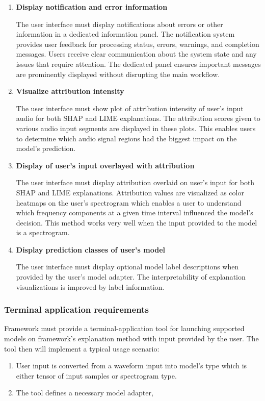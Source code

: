\documentclass[
    bindingoffset=5mm,  %
    footnoteindent=3mm, %
    hyphenation=true    %
]{src/wut-thesis}
\begin{document}
\begin{enumerate}
    \item \textbf{Display notification and error information}

        The user interface must display notifications about errors or other information in a dedicated information
    panel. The notification system provides user feedback for processing status, errors, warnings,
    and completion messages. Users receive clear communication about the system state and any issues that
    require attention. The dedicated panel ensures important messages are prominently displayed without
    disrupting the main workflow.

    \item \textbf{Visualize attribution intensity}

        The user interface must show plot of attribution intensity of user's input audio
    for both SHAP and LIME explanations. The attribution scores given to various audio input segments are displayed in these plots. This enables users to determine which audio signal regions had the biggest impact on the model's prediction.

    \item \textbf{Display of user's input overlayed with attribution}

        The user interface must display attribution overlaid on user's input for both SHAP and LIME explanations.
    Attribution values are visualized as color heatmaps on the user's spectrogram which enables a user to
    understand which frequency components at a given time interval influenced the model's decision.
    This method works very well when the input provided to the model is a spectrogram.

    \item \textbf{Display prediction classes of user's model}

        The user interface must display optional model label descriptions when provided by the user's model adapter.
    The interpretability of explanation visualizations is improved by label information.

    \end{enumerate}

\subsubsection{Terminal application requirements}
    Framework must provide a terminal-application tool for launching supported models on framework's explanation method with input provided by the user. The tool then will implement a typical usage scenario:
    \begin{enumerate}
        \item User input is converted from a waveform input into model's type which is either tensor of input samples or spectrogram type.
        \item The tool defines a necessary model adapter,
    \end{enumerate}
\end{document}
